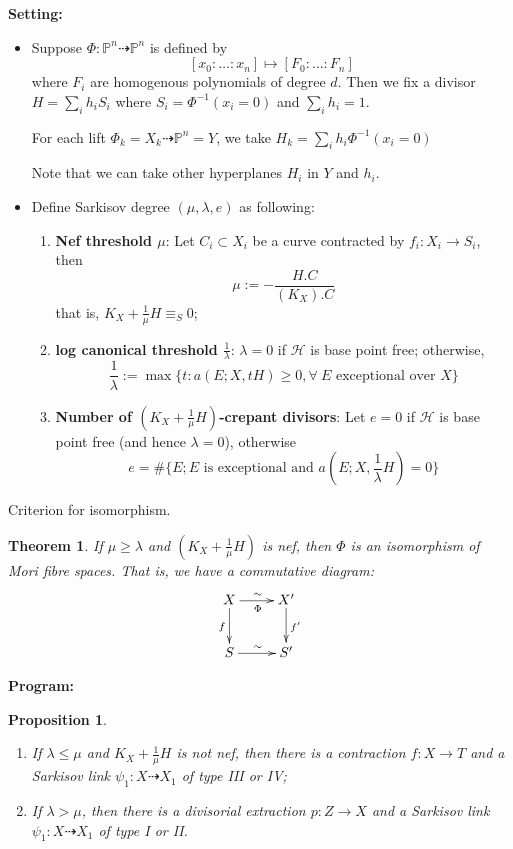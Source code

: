 \documentclass{article}
\newtheorem{prop}[defn]{Proposition}
\newtheorem{thm}[defn]{Theorem}
\begin{document}
\textbf{Setting:}
\begin{itemize}
	\item Suppose $\Phi: \mathbb{P}^{n}\dashrightarrow \mathbb{P}^{n} $ is defined by
	      \[
		      [x_{0}:\ldots :x_{n}] \mapsto [F_{0}:\ldots :F_{n}]
	      \]
	      where $F_{i}$ are homogenous polynomials of degree $d$. Then we fix a divisor $H=\sum_{i}h_{i}S_{i}$ where $S_{i}=\Phi^{-1}(x_{i}=0)$  and $\sum_{i}h_{i}=1$.

	      For each lift $ \Phi_{k}=X_{k}\dashrightarrow \mathbb{P}^{n}=Y$, we take $H_{k}=\sum_{i}h_{i}\Phi^{-1}(x_{i}=0)$

	      Note that we can take other hyperplanes $H_{i}$ in $Y$ and $h_{i}$.
	\item Define Sarkisov degree $(\mu,\lambda,e)$ as following:
	      \begin{enumerate}
		      \item \textbf{Nef threshold $ \mu $}: Let $ C_{i}\subset X_{i}  $ be a curve contracted by $ f_{i}:X_{i}\to S_{i} $, then
		            \[ \mu:=-\frac{H.C}{(K_X).C} \]
		            that is, $ K_X+\frac{1}{\mu} H \equiv_S0$;
		      \item \textbf{log canonical threshold  $ \frac{1}{\lambda} $}: $\lambda=0$ if $ \mathcal{H} $ is base point free; otherwise,
		            \[ \frac{1}{\lambda}:=\max\{t:a(E;X,tH)\geqslant 0,  \forall \ E\text{ exceptional over }X \}\]
		      \item \textbf{Number of $(K_{X}+\frac{1}{\mu}H)$-crepant divisors}: Let $ e=0 $ if $ \mathcal{H} $ is base point free (and hence $ \lambda=0 $), otherwise
		            \[ e=\#\{E; E \text{ is exceptional and } a(E;X,\frac{1}{\lambda} H)=0 \} \]
	      \end{enumerate}
\end{itemize}
Criterion for isomorphism.
\begin{thm}
	If $ \mu \geqslant \lambda $ and $ (K_X+\frac{1}{\mu} H) $ is nef, then $\Phi$ is an isomorphism of Mori fibre spaces. That is, we have a commutative diagram:
	\[ \xymatrix{
			X\ar[r]^\sim_\Phi\ar[d]_f&X'\ar[d]^{f'}\\
			S\ar[r]^\sim& S' } \]
\end{thm}
\textbf{Program:}
\begin{prop}
	\begin{enumerate}
		\item If $ \lambda\leqslant\mu $ and $ K_X+\frac{1}{\mu}H $ is not nef, then there is a contraction $f:X \to T$ and a Sarkisov link $\psi_{1}:X\dashrightarrow X_{1}$ of type III or IV;
		\item  If $ \lambda>\mu $, then there is a divisorial extraction $p:Z\to X$ and a Sarkisov link $ \psi_{1}:X\dashrightarrow X_{1}$ of type I or II.
	\end{enumerate}
\end{prop}
\end{document}
